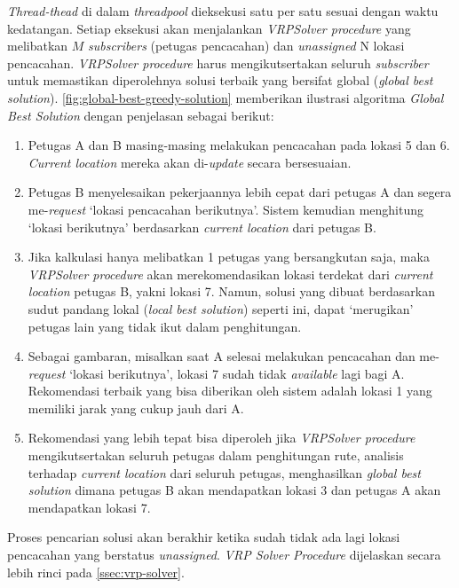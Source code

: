 \textit{Thread-thead} di dalam \textit{threadpool} dieksekusi satu per satu sesuai dengan waktu kedatangan. Setiap eksekusi akan menjalankan \textit{VRPSolver procedure} yang melibatkan $M$ \textit{subscribers} (petugas pencacahan) dan \textit{unassigned} N lokasi pencacahan. \textit{VRPSolver procedure} harus mengikutsertakan seluruh \textit{subscriber} untuk memastikan diperolehnya solusi terbaik yang bersifat global (\textit{global best solution}). \autoref{fig:global-best-greedy-solution} memberikan ilustrasi algoritma \textit{Global Best Solution} dengan penjelasan sebagai berikut:
\begin{enumerate}
	\item Petugas A dan B masing-masing melakukan pencacahan pada lokasi 5 dan 6. \textit{Current location} mereka akan di-\textit{update} secara bersesuaian.
	\item Petugas B menyelesaikan pekerjaannya lebih cepat dari petugas A dan segera me-\textit{request} `lokasi pencacahan berikutnya'. Sistem kemudian menghitung `lokasi berikutnya' berdasarkan \textit{current location} dari petugas B. 
	\item Jika kalkulasi hanya melibatkan 1 petugas yang bersangkutan saja, maka \textit{VRPSolver procedure} akan merekomendasikan lokasi terdekat dari \textit{current location} petugas B, yakni lokasi 7. Namun, solusi yang dibuat berdasarkan sudut pandang lokal (\textit{local best solution}) seperti ini, dapat `merugikan' petugas lain yang tidak ikut dalam penghitungan. 
	\item Sebagai gambaran, misalkan saat A selesai melakukan pencacahan dan me-\textit{request} `lokasi berikutnya', lokasi 7 sudah tidak \textit{available} lagi bagi A. Rekomendasi terbaik yang bisa diberikan oleh sistem adalah lokasi 1 yang memiliki jarak yang cukup jauh dari A. 
	\item Rekomendasi yang lebih tepat bisa diperoleh jika \textit{VRPSolver procedure} mengikutsertakan seluruh petugas dalam penghitungan rute, analisis terhadap \textit{current location} dari seluruh petugas, menghasilkan \textit{global best solution} dimana petugas B akan mendapatkan lokasi 3 dan petugas A akan mendapatkan lokasi 7. 

\end{enumerate}

  Proses pencarian solusi akan berakhir ketika sudah tidak ada lagi lokasi pencacahan yang berstatus \textit{unassigned}. \textit{VRP Solver Procedure} dijelaskan secara lebih rinci pada \autoref{ssec:vrp-solver}.	\color{black}


